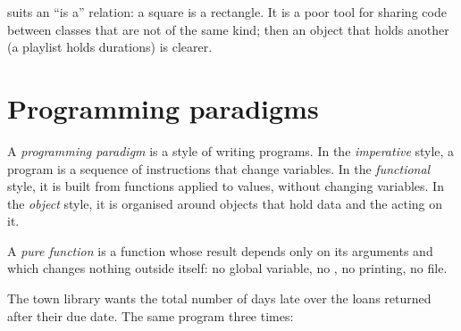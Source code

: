  suits an ``is a'' relation: a square is a rectangle. It is a poor tool for sharing code between classes
that are not of the same kind; then an object that holds another (a playlist holds durations) is clearer.

\section{Programming paradigms}\label{sec:g12:classes-and-objects:paradigms}

\begin{definition}\label{def:g12:classes-and-objects:paradigm}
A \emph{programming paradigm} is a style of writing programs. In the \emph{imperative}
style, a program is a sequence of instructions that change variables. In the \emph{functional} style, it is built
from functions applied to values, without changing variables. In the \emph{object} style, it is organised around
objects that hold data and the  acting on it.
\end{definition}

\begin{definition}\label{def:g12:classes-and-objects:pure-function}
A \emph{pure function} is a function whose result depends only on its arguments and which
changes nothing outside itself: no global variable, no , no printing, no file.
\end{definition}

The town library wants the total number of days late over the loans returned after their due date. The same program
three times:

\label{lst:g12:classes-and-objects:paradigms}

\label{out:g12:classes-and-objects:paradigms}


